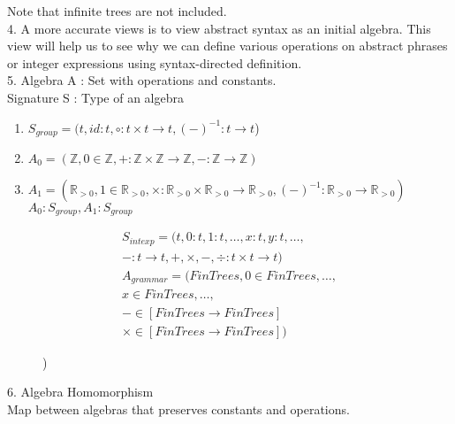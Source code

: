 \documentclass{article}[12pt]
\begin{document}
Note that infinite trees are not included. \\
4. A more accurate views is to view abstract syntax as an initial algebra. This view will help us to see why we can define various operations on abstract phrases or integer expressions using syntax-directed definition. \\
5. Algebra A : Set with operations and constants. \\
Signature S : Type of an algebra \\
\begin{enumerate}
    \item $S_{group} = (t, id:t, \circ:t\times t \rightarrow t, (-)^{-1}:t\rightarrow t$)
    \item $A_0 = (\mathbb{Z}, 0\in \mathbb{Z}, +:\mathbb{Z}\times \mathbb{Z}\rightarrow \mathbb{Z}, -:\mathbb{Z}\rightarrow \mathbb{Z})$
    \item $A_1 = (\mathbb{R}_{>0}, 1 \in \mathbb{R}_{>0}, \times:\mathbb{R}_{>0}\times\mathbb{R}_{>0}\rightarrow \mathbb{R}_{>0}, (-)^{-1}:\mathbb{R}_{>0} \rightarrow \mathbb{R}_{>0})$ \\
    $A_0 : S_{group}, A_1:S_{group}$
\end{enumerate}
\begin{align*}
    S_{intexp} = (t, 0:t, 1:t, \ldots, x:t, y:t, \ldots, \\
    -:t\rightarrow t, +, \times, -, \div : t \times t \rightarrow t) \\
    A_{grammar} = (FinTrees, 0\in FinTrees, \ldots, \\
    x\in FinTrees, \ldots, \\
    - \in [FinTrees \rightarrow FinTrees] \\
    \times \in [FinTrees \rightarrow FinTrees])
\end{align*}
\begin{figure}[h]
     \hspace{1cm}
    )
\end{figure}
6. Algebra Homomorphism \\
Map between algebras that preserves constants and operations.
\end{document}
